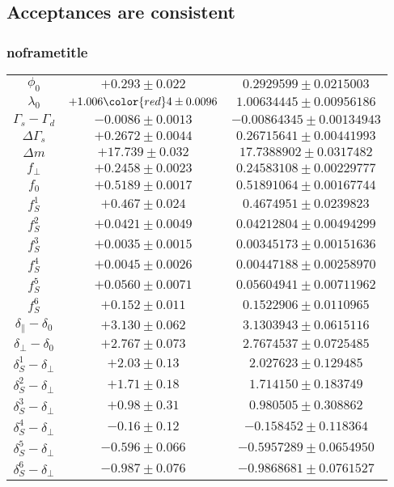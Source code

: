 \documentclass[aspectratio=43]{beamer}
\begin{document}
\subsection{Acceptances are consistent}
\begin{frame}[default]
\frametitle{noframetitle}

\begin{center}
\scriptsize
\begin{tabular}{ccc}
$\phi_0                         $&$ +0.293\pm0.022   $&$ 0.2929599    \pm 0.0215003 $ \\
$\lambda_0                      $&$ +1.006{\color{red}4}\pm0.0096 $&$  1.00634445   \pm 0.00956186 $ \\
$\Gamma_s - \Gamma_d            $&$ -0.0086\pm0.0013 $&$ -0.00864345  \pm 0.00134943 $ \\
$\Delta\Gamma_s                 $&$ +0.2672\pm0.0044 $&$ 0.26715641   \pm 0.00441993 $ \\
$\Delta m                       $&$ +17.739\pm0.032  $&$ 17.7388902   \pm 0.0317482 $ \\
$f_{\perp}                      $&$ +0.2458\pm0.0023 $&$ 0.24583108   \pm 0.00229777 $ \\
$ f_0                           $&$ +0.5189\pm0.0017 $&$ 0.51891064   \pm 0.00167744  $ \\
$f_S^{1}                        $&$ +0.467\pm0.024   $&$ 0.4674951    \pm 0.0239823 $ \\
$f_S^{2}                        $&$ +0.0421\pm0.0049 $&$ 0.04212804   \pm 0.00494299  $ \\
$f_S^{3}                        $&$ +0.0035\pm0.0015 $&$ 0.00345173   \pm 0.00151636  $ \\
$f_S^{4}                        $&$ +0.0045\pm0.0026 $&$ 0.00447188   \pm 0.00258970 $ \\
$f_S^{5}                        $&$ +0.0560\pm0.0071 $&$ 0.05604941   \pm 0.00711962 $ \\
$f_S^{6}                        $&$ +0.152\pm0.011   $&$ 0.1522906    \pm 0.0110965 $ \\
$\delta_{\parallel} - \delta_0  $&$ +3.130\pm0.062   $&$ 3.1303943    \pm 0.0615116 $ \\
$\delta_{\perp} - \delta_0      $&$ +2.767\pm0.073   $&$ 2.7674537    \pm 0.0725485  $ \\
$\delta_S^{1} - \delta_{\perp}  $&$ +2.03\pm0.13     $&$ 2.027623     \pm 0.129485 $ \\
$\delta_S^{2} - \delta_{\perp}  $&$ +1.71\pm0.18     $&$ 1.714150     \pm 0.183749 $ \\
$\delta_S^{3} - \delta_{\perp}  $&$ +0.98\pm0.31     $&$ 0.980505     \pm 0.308862 $ \\
$\delta_S^{4} - \delta_{\perp}  $&$ -0.16\pm0.12     $&$ -0.158452    \pm 0.118364 $ \\
$\delta_S^{5} - \delta_{\perp}  $&$ -0.596\pm0.066   $&$ -0.5957289   \pm 0.0654950 $ \\
$\delta_S^{6} - \delta_{\perp}  $&$ -0.987\pm0.076   $&$ -0.9868681   \pm 0.0761527 $ \\
\end{tabular}
\end{center}

\end{frame}
\end{document}
